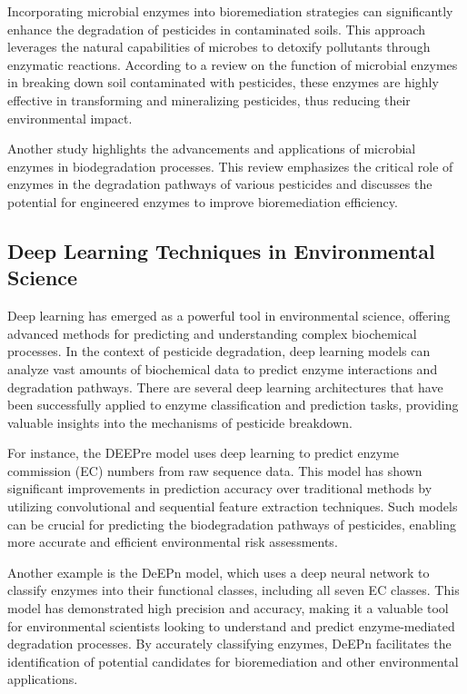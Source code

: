 Incorporating microbial enzymes into bioremediation strategies can significantly enhance the degradation of pesticides in contaminated soils. This approach leverages the natural capabilities of microbes to detoxify pollutants through enzymatic reactions. According to a review on the function of microbial enzymes in breaking down soil contaminated with pesticides, these enzymes are highly effective in transforming and mineralizing pesticides, thus reducing their environmental impact. \autocite{singhMicrobialDegradationOrganophosphorus2006}

Another study highlights the advancements and applications of microbial enzymes in biodegradation processes. This review emphasizes the critical role of enzymes in the degradation pathways of various pesticides and discusses the potential for engineered enzymes to improve bioremediation efficiency. \autocite{chiaFunctionMicrobialEnzymes2024}

\subsection{Deep Learning Techniques in Environmental Science}
\label{sec:Deep Learning Techniques in Environmental Science}

Deep learning has emerged as a powerful tool in environmental science, offering advanced methods for predicting and understanding complex biochemical processes. In the context of pesticide degradation, deep learning models can analyze vast amounts of biochemical data to predict enzyme interactions and degradation pathways. There are several deep learning architectures that have been successfully applied to enzyme classification and prediction tasks, providing valuable insights into the mechanisms of pesticide breakdown.

For instance, the DEEPre model uses deep learning to predict enzyme commission (EC) numbers from raw sequence data. This model has shown significant improvements in prediction accuracy over traditional methods by utilizing convolutional and sequential feature extraction techniques. Such models can be crucial for predicting the biodegradation pathways of pesticides, enabling more accurate and efficient environmental risk assessments. \autocite{liDEEPreSequencebasedEnzyme2017}

Another example is the DeEPn model, which uses a deep neural network to classify enzymes into their functional classes, including all seven EC classes. This model has demonstrated high precision and accuracy, making it a valuable tool for environmental scientists looking to understand and predict enzyme-mediated degradation processes. By accurately classifying enzymes, DeEPn facilitates the identification of potential candidates for bioremediation and other environmental applications. \autocite{DeEPnDeepNeural}


